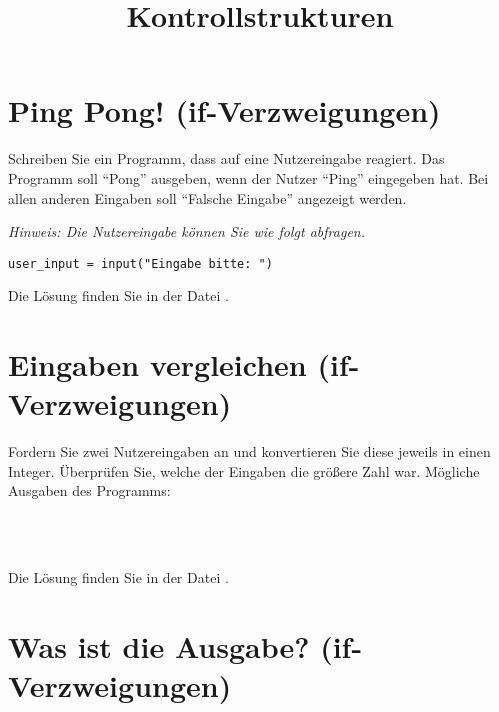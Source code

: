 

\title{Kontrollstrukturen}

\ihead{}
\chead{}
\ohead{}
\ifoot{}
\cfoot{\pagemark}
\ofoot{}



\setlength{\parskip}{1em}
\setlength{\parindent}{0em}
\renewcommand{\baselinestretch}{1.15}



\docheader

\section{Ping Pong! \small{(if-Verzweigungen)}}

Schreiben Sie ein Programm, dass auf eine Nutzereingabe reagiert. Das Programm soll "`Pong"' ausgeben, wenn der Nutzer "`Ping"' eingegeben hat. Bei allen anderen Eingaben soll "`Falsche Eingabe"' angezeigt werden.

\textit{Hinweis: Die Nutzereingabe können Sie wie folgt abfragen.}
\vspace{1em}
\begin{lstlisting}
user_input = input("Eingabe bitte: ")
\end{lstlisting}

Die Lösung finden Sie in der Datei .


\section{Eingaben vergleichen \small{(if-Verzweigungen)}}

Fordern Sie zwei Nutzereingaben an und konvertieren Sie diese jeweils in einen Integer. Überprüfen Sie, welche der Eingaben die größere Zahl war. Mögliche Ausgaben des Programms:

 \\
 \\

Die Lösung finden Sie in der Datei .


\section{Was ist die Ausgabe? \small{(if-Verzweigungen)}}



